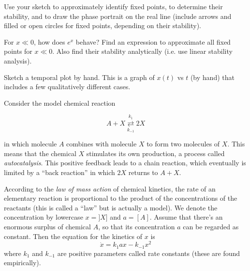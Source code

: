 \documentclass[12pt,letterpaper]{exam}
\begin{document}
\begin{questions}
\begin{parts}
\item Use your sketch to approximately identify fixed points, to determine their stability, and to draw the phase portrait on the real line (include arrows and filled or open circles for fixed points, depending on their stability).
\item For $x\ll 0$, how does $e^x$ behave?  Find an expression to approximate all fixed points for $x\ll 0$.  Also find their stability analytically (i.e. use linear stability analysis).
\item Sketch a temporal plot by hand.  This is a graph of $x(t)$ vs $t$ (by hand) that includes a few qualitatively different cases.
\end{parts}

\question Consider the model chemical reaction 

\[A+X \overset{k_1}{\underset{k_{-1}}\rightleftarrows} 2X\]

in which molecule $A$ combines with molecule $X$ to form two molecules of $X$.  This means that the chemical $X$ stimulates its own production, a process called \emph{autocatalysis}.  This positive feedback leads to a chain reaction, which eventually is limited by a ``back reaction'' in which $2X$ returns to $A+X$.  

According to the \emph{law of mass action} of chemical kinetics, the rate of an elementary reaction is proportional to the product of the concentrations of the reactants (this is called a ``law'' but is actually a model).  We denote the concentration by lowercase $x=]X]$ and $a=[A]$.  Assume that there's an enormous surplus of chemical $A$, so that its concentration $a$ can be regarded as constant.  Then the equation for the kinetics of $x$ is 
\[\dot{x} = k_1 a x - k_{-1}x^2\] where $k_1$ and $k_{-1}$ are positive parameters called rate constants (these are found empirically).



\end{questions}
\end{document}

